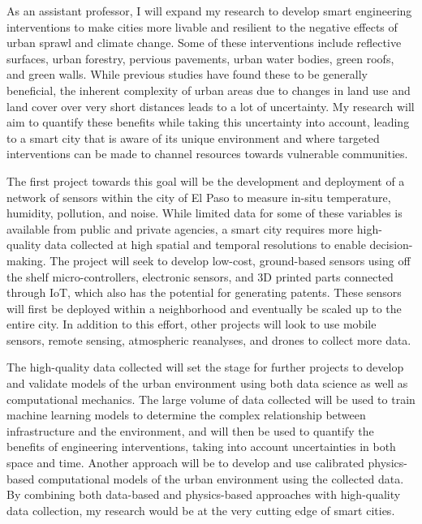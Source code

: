 \documentclass[12pt]{article}
\begin{document}
As an assistant professor, I will expand my research to develop smart engineering interventions to make cities more livable and resilient to the negative effects of urban sprawl and climate change. Some of these interventions include reflective surfaces, urban forestry, pervious pavements, urban water bodies, green roofs, and green walls. While previous studies have found these to be generally beneficial, the inherent complexity of urban areas due to changes in land use and land cover over very short distances leads to a lot of uncertainty. My research will aim to quantify these benefits while taking this uncertainty into account, leading to a smart city that is aware of its unique environment and where targeted interventions can be made to channel resources towards vulnerable communities.

The first project towards this goal will be the development and deployment of a network of sensors within the city of El Paso to measure in-situ temperature, humidity, pollution, and noise. While limited data for some of these variables is available from public and private agencies, a smart city requires more high-quality data collected at high spatial and temporal resolutions to enable decision-making. The project will seek to develop low-cost, ground-based sensors using off the shelf micro-controllers, electronic sensors, and 3D printed parts connected through IoT, which also has the potential for generating patents. These sensors will first be deployed within a neighborhood and eventually be scaled up to the entire city. In addition to this effort, other projects will look to use mobile sensors, remote sensing, atmospheric reanalyses, and drones to collect more data.

The high-quality data collected will set the stage for further projects to develop and validate models of the urban environment using both data science as well as computational mechanics. The large volume of data collected will be used to train machine learning models to determine the complex relationship between infrastructure and the environment, and will then be used to quantify the benefits of engineering interventions, taking into account uncertainties in both space and time. Another approach will be to develop and use calibrated physics-based computational models of the urban environment using the collected data. By combining both data-based and physics-based approaches with high-quality data collection, my research would be at the very cutting edge of smart cities.
\end{document}
